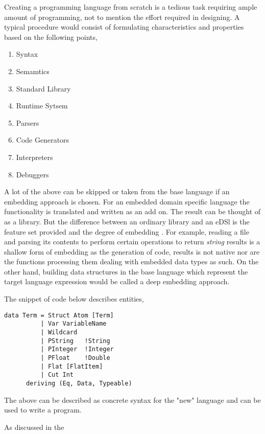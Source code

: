\documentclass[thesis-solanki.tex]{subfiles}
\begin{document}
Creating a programming language from scratch is a tedious task requiring ample amount of programming, not to mention the effort required in
designing. A typical procedure would consist of formulating characteristics and properties based on the following points,

\begin{enumerate}
\item Syntax
\item Semamtics
\item Standard Library
\item Runtime Sytsem
\item Parsers
\item Code Generators
\item Interpreters
\item Debuggers
\end{enumerate}

A lot of the above can be skipped or taken from the base language if an embedding approach is chosen.
For an embedded domain specific language the functionality is translated and written as an add on.
The result can be thought of as a library.
But the difference between an ordinary library and an eDSl is the feature set provided and the degree of embedding
\cite{website:eDSLhaskellwiki}.
For example, reading a file and parsing its contents to perform certain operations to return \textit{string}
results is a shallow form of embedding as the generation of code, results is not native nor are the functions
processing them dealing with embedded data types as such.
On the other hand, building data structures in the base language which represent the target language expression
would be called a deep embedding approach.

The snippet of  code below describes  entities,

\begin{verbatim}
data Term = Struct Atom [Term]
          | Var VariableName
          | Wildcard
          | PString   !String
          | PInteger  !Integer
          | PFloat    !Double
          | Flat [FlatItem]
          | Cut Int
      deriving (Eq, Data, Typeable)
\end{verbatim}

The above can be described as concrete syntax for the "new" language and can be used to write a program.


As discussed in the
\end{document}
